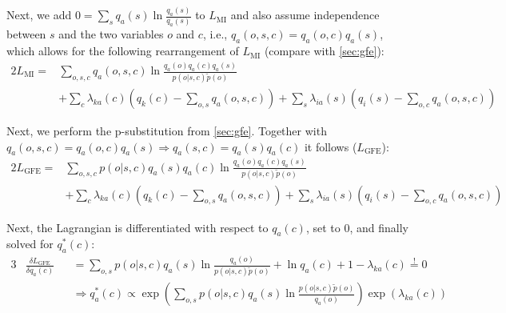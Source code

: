 Next, we add \(0 = \sum_s q_a(s) \ln \frac{q_a(s)}{q_a(s)}\) to \(L_{\text{MI}}\) and also assume independence between \(s\) and the two variables \(o\) and \(c\), i.e., \(q_a(o,s,c) = q_a(o,c)q_a(s)\), which allows for the following rearrangement of \(L_{\text{MI}}\) (compare with \cref{sec:gfe}):
\begin{alignat}{2}
    L_{\text{MI}} = & \sum_{o,s,c} q_a(o,s,c) \ln \frac{q_a(o)q_a(c)q_a(s)}{p(o|s,c)\tilde{p}(o)} \nonumber \\
    & + \sum_c \lambda_{ka}(c) \left( q_k(c) - \sum_{o,s} q_a(o,s,c) \right) + \sum_s \lambda_{ia}(s) \left( q_i(s) - \sum_{o,c} q_a(o,s,c) \right)
\end{alignat}

Next, we perform the p-substitution from \cref{sec:gfe}. Together with \(q_a(o,s,c) = q_a(o,c)q_a(s) \Rightarrow q_a(s,c) = q_a(s)q_a(c)\) it follows (\(L_{\text{GFE}}\)):
\begin{alignat}{2}
    L_{\text{GFE}} = & \sum_{o,s,c} p(o|s,c)q_a(s)q_a(c) \ln \frac{q_a(o)q_a(c)q_a(s)}{p(o|s,c)\tilde{p}(o)} \nonumber \\
    & + \sum_c \lambda_{ka}(c) \left( q_k(c) - \sum_{o,s} q_a(o,s,c) \right) + \sum_s \lambda_{ia}(s) \left( q_i(s) - \sum_{o,c} q_a(o,s,c) \right)
\end{alignat}

Next, the Lagrangian is differentiated with respect to \(q_a(c)\), set to \(0\), and finally solved for \(q^*_a(c)\):
\begin{alignat}{3}
     & \frac{\delta L_{\text{GFE}}}{\delta q_a(c)} &  & = \sum_{o,s} p(o|s,c)q_a(s) \ln \frac{q_a(o)}{p(o|s,c)\tilde{p}(o)} + \ln q_a(c) + 1 - \lambda_{ka}(c) \overset{!}{=} 0                                \\
     &                                             &  & \Rightarrow q^*_a(c) \propto \exp \left( \sum_{o,s} p(o|s,c)q_a(s) \ln \frac{p(o|s,c)\tilde{p}(o)}{q_a(o)} \right) \exp \left( \lambda_{ka}(c) \right)
\end{alignat}

